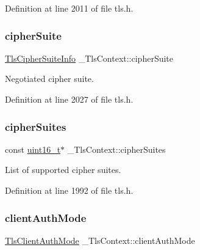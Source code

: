 Definition at line 2011 of file tls.\+h.

\mbox{\label{struct__TlsContext_a1917578a8aa5eb1082db32ea57d39c48}} 
\subsubsection{\texorpdfstring{cipher\+Suite}{cipherSuite}}
{\footnotesize\ttfamily \hyperlink{structTlsCipherSuiteInfo}{Tls\+Cipher\+Suite\+Info} \+\_\+\+Tls\+Context\+::cipher\+Suite}



Negotiated cipher suite. 



Definition at line 2027 of file tls.\+h.

\mbox{\label{struct__TlsContext_a88ee16ad0220734aba6b5e61554b6dfa}} 
\subsubsection{\texorpdfstring{cipher\+Suites}{cipherSuites}}
{\footnotesize\ttfamily const \hyperlink{stdint_8h_a273cf69d639a59973b6019625df33e30}{uint16\+\_\+t}$\ast$ \+\_\+\+Tls\+Context\+::cipher\+Suites}



List of supported cipher suites. 



Definition at line 1992 of file tls.\+h.

\mbox{\label{struct__TlsContext_ad1305e63b697aaed05d6ba3722bfbd59}} 
\subsubsection{\texorpdfstring{client\+Auth\+Mode}{clientAuthMode}}
{\footnotesize\ttfamily \hyperlink{tls_8h_a657708ec632fe90da5a94cf667118527}{Tls\+Client\+Auth\+Mode} \+\_\+\+Tls\+Context\+::client\+Auth\+Mode}



